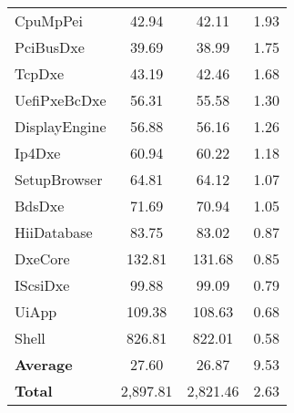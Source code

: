 \begin{longtable}{l c c c}
  CpuMpPei & 42.94 & 42.11 & 1.93\\
  PciBusDxe & 39.69 & 38.99 & 1.75\\
  TcpDxe & 43.19 & 42.46 & 1.68\\
  UefiPxeBcDxe & 56.31 & 55.58 & 1.30\\
  DisplayEngine & 56.88 & 56.16 & 1.26\\
  Ip4Dxe & 60.94 & 60.22 & 1.18\\
  SetupBrowser & 64.81 & 64.12 & 1.07\\
  BdsDxe & 71.69 & 70.94 & 1.05\\
  HiiDatabase & 83.75 & 83.02 & 0.87\\
  DxeCore & 132.81 & 131.68 & 0.85\\
  IScsiDxe & 99.88 & 99.09 & 0.79\\
  UiApp & 109.38 & 108.63 & 0.68\\
  Shell & 826.81 & 822.01 & 0.58\\
  \midrule
  \textbf{Average} & 27.60 & 26.87 & 9.53\\
  \textbf{Total} & 2,897.81 & 2,821.46 & 2.63\\
  \bottomrule
\end{longtable}

